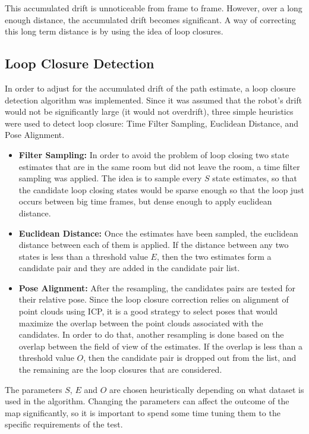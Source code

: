\documentclass[12pt]{article}
\begin{document}
This accumulated drift is unnoticeable from frame to frame. However, over a long enough distance, the accumulated drift becomes significant. A way of correcting this long term distance is by using the idea of loop closures.
	
	\subsection{Loop Closure Detection}
	\label{subs:LoopCl}

In order to adjust for the accumulated drift of the path estimate, a loop closure detection algorithm was implemented. Since it was assumed that the robot's drift would not be significantly large (it would not overdrift), three simple heuristics were used to detect loop closure: Time Filter Sampling, Euclidean Distance, and Pose Alignment. 

\begin{itemize}
\item \textbf{Filter Sampling:} In order to avoid the problem of loop closing two state estimates that are in the same room but did not leave the room, a time filter sampling was applied. The idea is to sample every $S$ state estimates, so that the candidate loop closing states would be sparse enough so that the loop just occurs between big time frames, but dense enough to apply euclidean distance.
\item \textbf{Euclidean Distance:} Once the estimates have been  sampled, the euclidean distance between each of them is applied. If the distance between any two states is less than a threshold value $E$, then the two estimates form a candidate pair and they are added in the candidate pair list.
\item \textbf{Pose Alignment:} After the resampling, the candidates pairs are tested for their relative pose. Since the loop closure correction relies on alignment of point clouds using ICP, it is a good strategy to select poses that would maximize the overlap between the point clouds associated with the candidates. In order to do that, another resampling is done based on the overlap between the field of view of the estimates. If the overlap is less than a threshold value $O$, then the candidate pair is dropped out from the list, and the remaining are the loop closures that are considered.
\end{itemize}
	
The parameters $S$, $E$ and $O$ are chosen heuristically depending on what dataset is used in the algorithm. Changing the parameters can affect the outcome of the map significantly, so it is important to spend some time tuning them to the specific requirements of the test.
	
\end{document}
